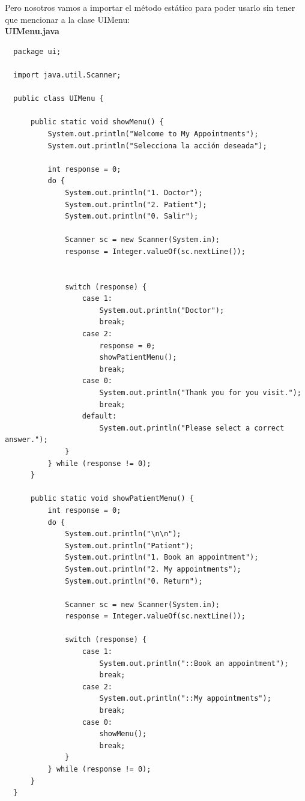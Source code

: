 \documentclass{article}
\begin{document}
Pero nosotros vamos a importar el método estático para poder usarlo sin tener
que mencionar a la clase UIMenu:\\

\textbf{UIMenu.java}
\begin{verbatim}
  package ui;

  import java.util.Scanner;

  public class UIMenu {

      public static void showMenu() {
          System.out.println("Welcome to My Appointments");
          System.out.println("Selecciona la acción deseada");

          int response = 0;
          do {
              System.out.println("1. Doctor");
              System.out.println("2. Patient");
              System.out.println("0. Salir");

              Scanner sc = new Scanner(System.in);
              response = Integer.valueOf(sc.nextLine());


              switch (response) {
                  case 1:
                      System.out.println("Doctor");
                      break;
                  case 2:
                      response = 0;
                      showPatientMenu();
                      break;
                  case 0:
                      System.out.println("Thank you for you visit.");
                      break;
                  default:
                      System.out.println("Please select a correct answer.");
              }
          } while (response != 0);
      }

      public static void showPatientMenu() {
          int response = 0;
          do {
              System.out.println("\n\n");
              System.out.println("Patient");
              System.out.println("1. Book an appointment");
              System.out.println("2. My appointments");
              System.out.println("0. Return");

              Scanner sc = new Scanner(System.in);
              response = Integer.valueOf(sc.nextLine());

              switch (response) {
                  case 1:
                      System.out.println("::Book an appointment");
                      break;
                  case 2:
                      System.out.println("::My appointments");
                      break;
                  case 0:
                      showMenu();
                      break;
              }
          } while (response != 0);
      }
  }
\end{verbatim}
\end{document}
